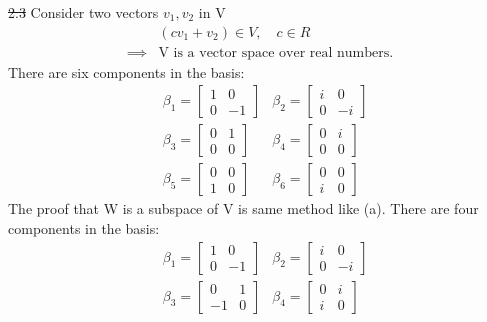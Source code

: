 \documentclass[12pt, a4paper]{article}
\begin{document}
\begin{CJK*}{UTF8}{bsmi}
\st{2.3}
Consider two vectors \(v_1,v_2\) in V
\begin{align}
    &(cv_1+v_2)\in V,\quad c\in R\\
    \implies & \text{V is a vector space over real numbers.}
\end{align}
There are six components in the basis:\begin{align}
    &\beta_1 = \begin{bmatrix}
        1 & 0\\
        0 & -1
    \end{bmatrix} &\beta_2 = \begin{bmatrix}
        i & 0\\
        0 & -i
    \end{bmatrix}\\
    &\beta_3 = \begin{bmatrix}
        0 & 1\\
        0 & 0
    \end{bmatrix} &\beta_4 = \begin{bmatrix}
        0 & i \\
        0 & 0
    \end{bmatrix}\\
    &\beta_5 = \begin{bmatrix}
        0 & 0\\
        1 & 0 
    \end{bmatrix} &\beta_6 = \begin{bmatrix}
        0 & 0\\
        i & 0
    \end{bmatrix}
\end{align}
The proof that W is a subspace of V is same method like (a). There are four components in the basis:
\begin{align}
    &\beta_1 = \begin{bmatrix}
        1 & 0\\
        0 & -1
    \end{bmatrix} &\beta_2 = \begin{bmatrix}
        i & 0\\
        0 & -i
    \end{bmatrix}\\
    &\beta_3 = \begin{bmatrix}
        0 & 1\\
        -1 & 0
    \end{bmatrix} &\beta_4 = \begin{bmatrix}
        0 & i \\
        i & 0
    \end{bmatrix}
\end{align}
\end{CJK*}
\end{document}
